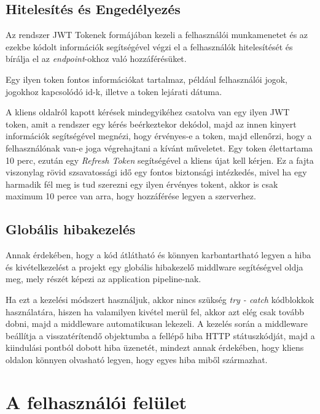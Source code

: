 \subsection{Hitelesítés és Engedélyezés}

Az rendszer JWT Tokenek\cite{jwtdocs} formájában kezeli a felhasználói munkamenetet és az ezekbe kódolt információk segítségével végzi el a felhasználók hitelesítését és bírálja el az \textit{endpoint}-okhoz való hozzáférésüket.

Egy ilyen token fontos információkat tartalmaz, például felhasználói jogok, jogokhoz kapcsolódó id-k, illetve a token lejárati dátuma. 

A kliens oldalról kapott kérések mindegyikéhez csatolva van egy ilyen JWT token, amit a rendszer egy kérés beérkeztekor dekódol, majd az innen kinyert információk segítségével megnézi, hogy érvényes-e a token, majd ellenőrzi, hogy a felhasználónak van-e joga végrehajtani a kívánt műveletet. Egy token élettartama 10 perc, ezután egy \textit{Refresh Token} segítségével a kliens újat kell kérjen. Ez a fajta viszonylag rövid szsavatossági idő egy fontos biztonsági intézkedés, mivel ha egy harmadik fél meg is tud szerezni egy ilyen érvényes tokent, akkor is csak maximum 10 perce van arra, hogy hozzáférése legyen a szerverhez. 

\subsection{Globális hibakezelés}

Annak érdekében, hogy a kód átlátható és könnyen karbantartható legyen a hiba és kivételkezelést a projekt egy globális hibakezelő middlware segítéségvel oldja meg, mely részét képezi az application pipeline-nak.

Ha ezt a kezelési módszert használjuk, akkor nincs szükség \textit{try - catch} kódblokkok használatára, hiszen ha valamilyen kivétel merül fel, akkor azt elég csak tovább dobni, majd a middleware automatikusan lekezeli. A kezelés során a middleware beállítja a visszatérítendő objektumba a fellépő hiba HTTP státuszkódját, majd a kiindulási pontból dobott hiba üzenetét, mindezt annak érdekében, hogy kliens oldalon könnyen olvasható legyen, hogy egyes hiba miből származhat.

\section{A felhasználói felület}

